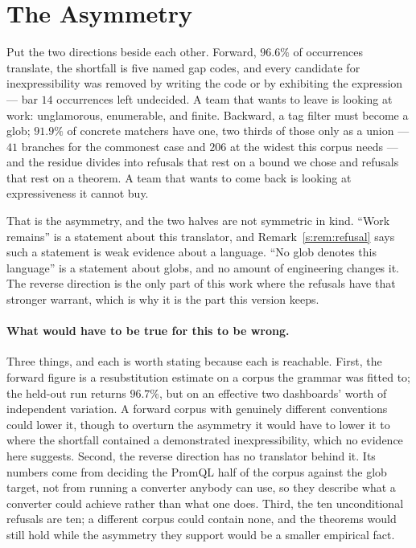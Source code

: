 
\section{The Asymmetry}
\label{s:sec:asymmetry}

Put the two directions beside each other. Forward, $96.6\%$ of occurrences translate, the
shortfall is five named gap codes, and every candidate for inexpressibility was removed by
writing the code or by exhibiting the expression --- bar $14$ occurrences left undecided.
A team that wants to leave is looking at work: unglamorous, enumerable, and finite.
Backward, a tag filter must become a glob; $91.9\%$ of concrete matchers have one, two
thirds of those only as a union --- $41$ branches for the commonest case and $206$ at the
widest this corpus needs --- and the residue divides into refusals that rest on a bound we
chose and refusals that rest on a theorem. A team that
wants to come back is looking at expressiveness it cannot buy.

That is the asymmetry, and the two halves are not symmetric in kind. ``Work remains''
is a statement about this translator, and Remark~\ref{s:rem:refusal} says such a statement
is weak evidence about a language. ``No glob denotes this language'' is a statement about
globs, and no amount of engineering changes it. The reverse direction is the only part of
this work where the refusals have that stronger warrant, which is why it is the part this
version keeps.

\paragraph{What would have to be true for this to be wrong.}
Three things, and each is worth stating because each is reachable. First, the forward
figure is a resubstitution estimate on a corpus the grammar was fitted to; the held-out
run returns $96.7\%$, but on an effective two dashboards' worth of independent variation.
A forward corpus with genuinely different conventions could lower it, though to overturn
the asymmetry it would have to lower it to where the shortfall contained a demonstrated
inexpressibility, which no evidence here suggests. Second, the reverse direction has no
translator behind it. Its numbers come from deciding the PromQL half of the corpus against
the glob target, not from running a converter anybody can use, so they describe what a
converter could achieve rather than what one does. Third, the ten unconditional refusals
are ten; a different corpus could contain none, and the theorems would still hold while the
asymmetry they support would be a smaller empirical fact.

